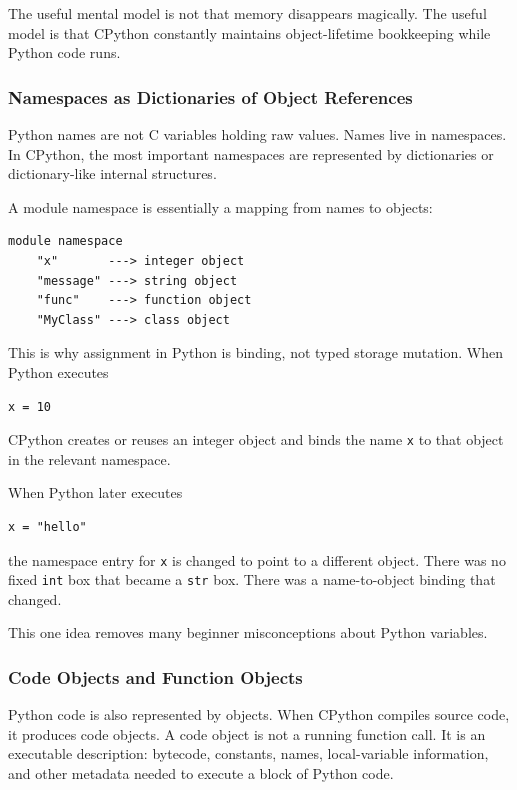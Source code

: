 The useful mental model is not that memory disappears magically. The useful model is that CPython constantly maintains object-lifetime bookkeeping while Python code runs.

\subsubsection{Namespaces as Dictionaries of Object References}

Python names are not C variables holding raw values. Names live in namespaces. In CPython, the most important namespaces are represented by dictionaries or dictionary-like internal structures.

A module namespace is essentially a mapping from names to objects:

\begin{verbatim}
module namespace
    "x"       ---> integer object
    "message" ---> string object
    "func"    ---> function object
    "MyClass" ---> class object
\end{verbatim}

This is why assignment in Python is binding, not typed storage mutation. When Python executes

\begin{verbatim}
x = 10
\end{verbatim}

CPython creates or reuses an integer object and binds the name \texttt{x} to that object in the relevant namespace.

When Python later executes

\begin{verbatim}
x = "hello"
\end{verbatim}

the namespace entry for \texttt{x} is changed to point to a different object. There was no fixed \texttt{int} box that became a \texttt{str} box. There was a name-to-object binding that changed.

This one idea removes many beginner misconceptions about Python variables.

\subsubsection{Code Objects and Function Objects}

Python code is also represented by objects. When CPython compiles source code, it produces code objects. A code object is not a running function call. It is an executable description: bytecode, constants, names, local-variable information, and other metadata needed to execute a block of Python code.

